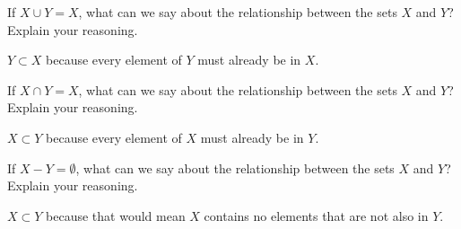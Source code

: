 \documentclass[nooutcomes]{ximera}
\begin{document}
\begin{problem}
If $X\cup Y = X$, what can we say about the relationship between the sets $X$ and $Y$? Explain your reasoning.
\begin{freeResponse}
\begin{hint}
$Y\subset X$ because every element of $Y$ must already be in $X$.  
\end{hint}
\end{freeResponse}
\end{problem}

\begin{problem}
If $X\cap Y = X$, what can we say about the relationship between the sets $X$ and $Y$? Explain your reasoning.
\begin{freeResponse}
\begin{hint}
$X\subset Y$ because every element of $X$ must already be in $Y$.  
\end{hint}
\end{freeResponse}
\end{problem}

\begin{problem}
If $X-Y =\emptyset$, what can we say about the relationship between the sets $X$ and $Y$? Explain your reasoning.
\begin{freeResponse}
\begin{hint}
$X\subset Y$ because that would mean $X$ contains no elements that are not also in $Y$.
\end{hint}
\end{freeResponse}
\end{problem}
\end{document}
